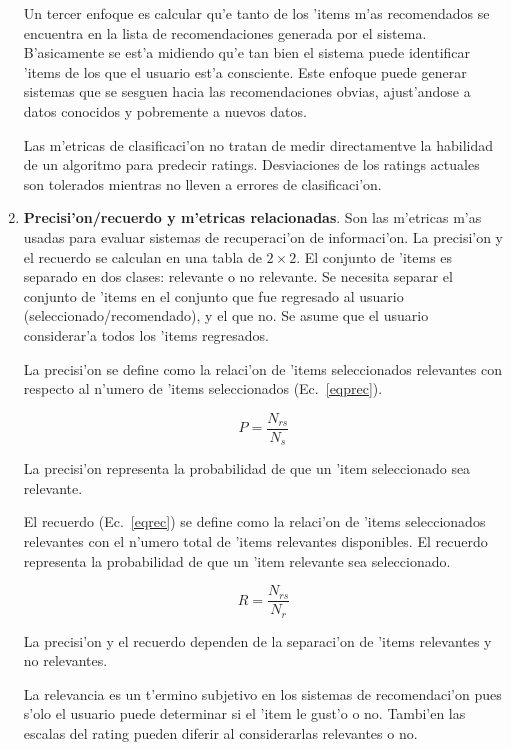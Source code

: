 \documentclass[11pt]{article}
\begin{document}
\begin{enumerate}
Un tercer enfoque es calcular qu'e tanto de los 'items m'as recomendados se encuentra en la lista de recomendaciones generada por el sistema. B'asicamente se est'a midiendo qu'e tan bien el sistema puede identificar 'items de los que el usuario est'a consciente. Este enfoque puede generar sistemas que se sesguen hacia las recomendaciones obvias, ajust'andose a datos conocidos y pobremente a nuevos datos.

Las m'etricas de clasificaci'on no tratan de medir directamentve la habilidad de un algoritmo para predecir ratings. Desviaciones de los ratings actuales son tolerados mientras no lleven a errores de clasificaci'on.


\item \textbf{Precisi'on/recuerdo y m'etricas relacionadas}. Son las m'etricas m'as usadas para evaluar sistemas de recuperaci'on de informaci'on. La precisi'on y el recuerdo se calculan en una tabla de $2 \times 2$. El conjunto de 'items es separado en dos clases: relevante o no relevante. Se necesita separar el conjunto de 'items en  el conjunto que fue regresado al usuario (seleccionado/recomendado), y el que no. Se asume que el usuario considerar'a todos los 'items regresados.

La precisi'on se define como la relaci'on de 'items seleccionados relevantes con respecto al n'umero de 'items seleccionados (Ec.~\ref{eqprec}).

\begin{equation}
P = \frac{N_{rs}}{N_s}
\label{eqprec}
\end{equation}

La precisi'on representa la probabilidad de que un 'item seleccionado sea relevante. 

El recuerdo (Ec.~\ref{eqrec}) se define como la relaci'on de 'items seleccionados relevantes con el n'umero total de 'items relevantes disponibles. El recuerdo representa la probabilidad de que un 'item relevante sea seleccionado.


\begin{equation}
R = \frac{N_{rs}}{N_r}
\label{eqrec}
\end{equation}

La precisi'on y el recuerdo dependen de la separaci'on de 'items relevantes y no relevantes.

La relevancia es un t'ermino subjetivo en los sistemas de recomendaci'on pues s'olo el usuario puede determinar si el 'item le gust'o o no. Tambi'en las escalas del rating pueden diferir al considerarlas relevantes o no. 


\end{enumerate}
\end{document}
